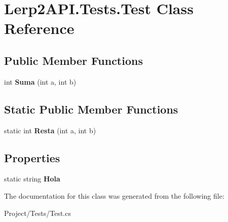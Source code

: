 \hypertarget{class_lerp2_a_p_i_1_1_tests_1_1_test}{}\section{Lerp2\+A\+P\+I.\+Tests.\+Test Class Reference}
\label{class_lerp2_a_p_i_1_1_tests_1_1_test}
\subsection*{Public Member Functions}
\begin{DoxyCompactItemize}
\item 
\mbox{\label{class_lerp2_a_p_i_1_1_tests_1_1_test_a46da4cdc88b439a8d40bd10ebae4502e}} 
int {\bfseries Suma} (int a, int b)
\end{DoxyCompactItemize}
\subsection*{Static Public Member Functions}
\begin{DoxyCompactItemize}
\item 
\mbox{\label{class_lerp2_a_p_i_1_1_tests_1_1_test_ac97c19d970a06b22b01a3962b5978413}} 
static int {\bfseries Resta} (int a, int b)
\end{DoxyCompactItemize}
\subsection*{Properties}
\begin{DoxyCompactItemize}
\item 
\mbox{\label{class_lerp2_a_p_i_1_1_tests_1_1_test_a3d7e3cff727bb7047e49b310ab1ca9e9}} 
static string {\bfseries Hola}
\end{DoxyCompactItemize}


The documentation for this class was generated from the following file\+:\begin{DoxyCompactItemize}
\item 
Project/\+Tests/Test.\+cs\end{DoxyCompactItemize}
